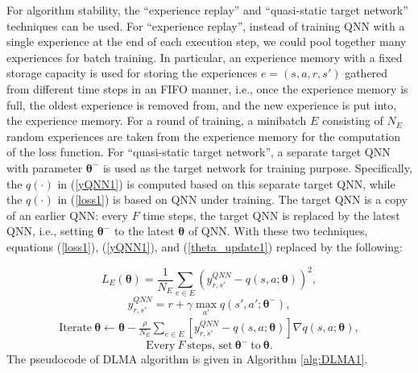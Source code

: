 \documentclass[journal,comsoc]{IEEEtran}
\begin{document}
For algorithm stability,  the ``experience replay'' and ``quasi-static target network'' techniques can be used\cite{DQNpaper}. For ``experience replay'', instead of training QNN with a single experience at the end of each execution step, we could pool together many experiences for batch training. In particular, an experience memory with a fixed storage capacity is used for storing the experiences $e = \left( {s,a,r,s'} \right)$  gathered from different time steps in an FIFO manner, i.e., once the experience memory is full, the oldest experience is removed from, and the new experience is put into, the experience memory. For a round of training, a minibatch  $ E $ consisting of $ N_E $  random experiences are taken from the experience memory for the computation of the loss function.  For ``quasi-static target network'', a separate target QNN with parameter $ \bm{\theta^- } $ is used as the target network for training purpose. Specifically, the   $q\left( \cdot \right)$ in (\ref{yQNN1}) is computed based on this separate target QNN, while the $q\left( \cdot \right)$  in (\ref{loss1}) is based on QNN under training. The target QNN is a copy of an earlier QNN: every  $ F $ time steps, the target QNN is replaced by the latest QNN, i.e., setting $ \bm{\theta^- } $ to the latest  $ \bm{\theta } $  of QNN. With these two techniques, equations (\ref{loss1}), (\ref{yQNN1}), and (\ref{theta_update1}) replaced by the following: 

\begin{equation}\label{loss2}
{L_E}\left( {{\bm{\theta }}} \right) = \frac{1}{{{N_E}}}\sum\limits_{e \in {E}} {{{\left( {y_{r,s'}^{QNN} - q\left( {s,a;{\bm{\theta }}} \right)} \right)}^2}}, 
\end{equation}
\begin{equation}\label{yQNN2}
y_{r,s'}^{QNN} = r + \gamma {\max _{a'}}q\left( {s',a';{\bm{\theta^- }}} \right),
\end{equation}
\begin{align}\label{theta_update2}
\text{Iterate} \ {\bm{\theta }} \leftarrow {\bm{\theta }} - \frac{\rho }{{{N_E}}} \sum\limits_{e \in {E}} {\left[ {y_{r,s'}^{QNN} - q\left( {s,a;{\bm{\theta }}} \right)} \right]\nabla q\left( {s,a;{\bm{\theta }}} \right)}, 
\end{align}
\begin{equation}
\text{Every} \ F \ \text{steps, set}  \ \bm{\theta^- } \ \text{to} \ \bm{\theta }.
\end{equation}
The pseudocode of DLMA algorithm is given in Algorithm \ref{alg:DLMA1}.
\end{document}
